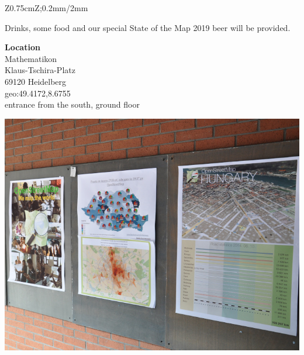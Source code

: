 \begin{landscape}
\begin{center}
\begin{tabular}{Z{0.75cm}Z{\socialEventBoxWidth};{0.2mm/2mm}}
\begin{minipage}[t]{\socialEventBoxWidth}
\begin{minipage}[c]{0.4\linewidth}
          Drinks, some food and our special State of the Map 2019 beer will be provided.

          \vspace{\socialEventSectionSep}
          \textbf{Location}\\
          Mathematikon\\
          Klaus-Tschira-Platz\\
          69120 Heidelberg\\
          geo:49.4172,8.6755\\
          entrance from the south, ground floor 
          \justifying
        \end{minipage}
        \hfill
        \noindent\begin{minipage}[c]{0.57\linewidth}
          \begin{center}
            \includegraphics[width=0.9\linewidth]{images-print/posters-sotm-eu-2014.jpg}

          \end{center}
        \end{minipage}
      \end{minipage}
      \vspace{0.4\multicolsep}
      \tabularnewline
    \end{tabular}
  \end{center}
\end{landscape}
\renewcommand{\arraystretch}{1.0}
\normalsize
